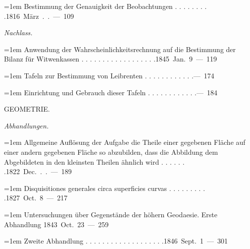 \par\noindent\hangindent=1em Bestimmung der Genauigkeit der Beobachtungen . . . . . . . . .\hfill{}\hbox{}\nobreak\hfill\mbox{1816 März . . — 109}\par
\par\medskip{}
\noindent\textit{Nachlass.}\par
\par\noindent\hangindent=1em Anwendung der Wahrscheinlichkeitsrechnung auf die Bestimmung der Bilanz für Witwenkassen . . . . . . . . . . . . . . . . . .\hfill{}\hbox{}\nobreak\hfill\mbox{1845 Jan. 9 — 119}\par
\par\noindent\hangindent=1em Tafeln zur Bestimmung von Leibrenten . . . . . . . . . . . .\hfill{}\hbox{}\nobreak\hfill\mbox{— 174}\par
\par\noindent\hangindent=1em Einrichtung und Gebrauch dieser Tafeln . . . . . . . . . . . .\hfill{}\hbox{}\nobreak\hfill\mbox{— 184}\par
\par\medskip{}
\begin{center}GEOMETRIE.\end{center}
\par\medskip{}
\noindent\textit{Abhandlungen.}\par
\par\noindent\hangindent=1em Allgemeine Auflösung der Aufgabe die Theile einer gegebenen Fläche auf einer andern gegebenen Fläche so abzubilden, dass die Abbildung dem Abgebildeten in den kleinsten Theilen ähnlich wird . . . . . . .\hfill{}\hbox{}\nobreak\hfill\mbox{1822 Dec. . . — 189}\par
\par\noindent\hangindent=1em Disquisitiones generales circa superficies curvas . . . . . . . . . .\hfill{}\hbox{}\nobreak\hfill\mbox{1827 Oct. 8 — 217}\par
\par\noindent\hangindent=1em Untersuchungen über Gegenstände der höhern Geodaesie. Erste Abhandlung \hfill{}\hbox{}\nobreak\hfill\mbox{1843 Oct. 23 — 259}\par
\par\noindent\hangindent=1em Zweite Abhandlung . . . . . . . . . . . . . . . . . . .\hfill{}\hbox{}\nobreak\hfill\mbox{1846 Sept. 1 — 301}\par
\endgroup
